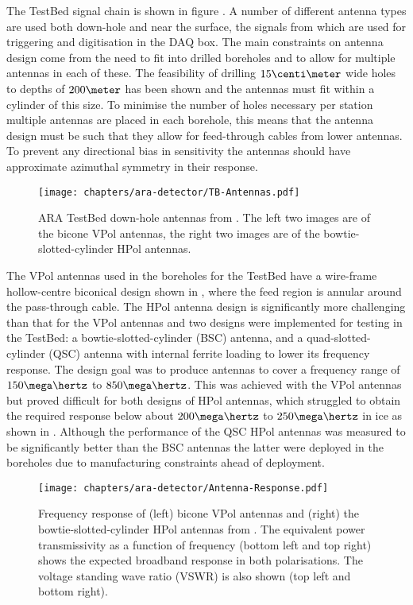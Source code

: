 The TestBed signal chain is shown in figure . A number of different antenna types are used both down-hole and near the surface, the signals from which are used for triggering and digitisation in the DAQ box. The main constraints on antenna design come from the need to fit into drilled boreholes and to allow for multiple antennas in each of these. The feasibility of drilling $15 \centi\meter$ wide holes to depths of $200 \meter$ has been shown and the antennas must fit within a cylinder of this size. To minimise the number of holes necessary per station multiple antennas are placed in each borehole, this means that the antenna design must be such that they allow for feed-through cables from lower antennas. To prevent any directional bias in sensitivity the antennas should have approximate azimuthal symmetry in their response. 

\begin{figure}[htpb]
  \centering
  \texttt{[image: chapters/ara-detector/TB-Antennas.pdf]}
  \caption{ARA TestBed down-hole antennas from  \cite{Allison2012457}. The left two images are of the bicone VPol antennas, the right two images are of the bowtie-slotted-cylinder HPol antennas.}
  \label{fig:ara-detector:TestBed:Antennas}
\end{figure}

The VPol antennas used in the boreholes for the TestBed have a wire-frame hollow-centre biconical design shown in , where the feed region is annular around the pass-through cable. The HPol antenna design is significantly more challenging than that for the VPol antennas and two designs were implemented for testing in the TestBed: a bowtie-slotted-cylinder (BSC) antenna, and a quad-slotted-cylinder (QSC) antenna with internal ferrite loading to lower its frequency response. The design goal was to produce antennas to cover a frequency range of $150 \mega \hertz$ to $850 \mega \hertz$. This was achieved with the VPol antennas but proved difficult for both designs of HPol antennas, which struggled to obtain the required response below about $200 \mega \hertz$ to $250 \mega \hertz$ in ice as shown in . Although the performance of the QSC HPol antennas was measured to be significantly better than the BSC antennas the latter were deployed in the boreholes due to manufacturing constraints ahead of deployment.

\begin{figure}[htpb]
  \centering
  \texttt{[image: chapters/ara-detector/Antenna-Response.pdf]}
  \caption{Frequency response of (left) bicone VPol antennas and (right) the bowtie-slotted-cylinder HPol antennas from \cite{Allison2012457}. The equivalent power transmissivity as a function of frequency  (bottom left and top right) shows the expected broadband response in both polarisations. The voltage standing wave ratio (VSWR) is also shown (top left and bottom right).}
  \label{fig:ara-detector:TestBed:Signal-Chain:Frequency-Response}
\end{figure}


